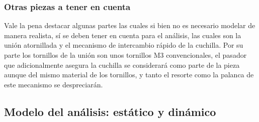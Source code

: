 \documentclass[12pt,letterpaper]{article}
\begin{document}
\subsubsection*{Otras piezas a tener en cuenta}
Vale la pena destacar algunas partes las cuales si bien no es necesario modelar de manera realista, sí se deben tener en cuenta
para el análisis, las cuales son la unión atornillada y el mecanismo de intercambio rápido de la cuchilla. Por su parte los tornillos de la unión son 
unos tornillos M3 convencionales, el pasador que adicionalmente asegura la cuchilla se considerará como parte de la pieza aunque del mismo material de los tornillos,
 y tanto el resorte como la palanca de este mecanismo se despreciarán.


\subsection{Modelo del análisis: estático y dinámico}
\end{document}
